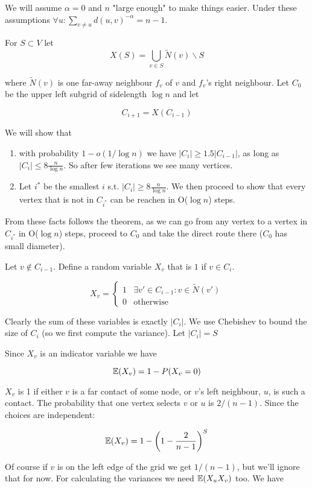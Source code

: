 \begin{pr} We will assume $\alpha=0$ and $n$ "large enough" to make things easier. Under these assumptions $\forall u: \sum_{v\neq u} d(u,v)^{-\alpha} = n-1$. 

For $S\subset V$ let 
\[X(S) = \bigcup_{v\in S} \tilde N(v) \backslash S\]

where $\tilde N(v)$ is one far-away neighbour $f_v$ of $v$ and $f_v$'s right neighbour. Let $C_0$ be the upper left subgrid of sidelength $\log n$ and let

\[C_{i+1} = X(C_{i-1})\]

We will show that 

\begin{enumerate}
\item with probability $1-o(1/\log n)$ we have $|C_i| \geq 1.5 |C_{i-1}|$, as long as $|C_i| \leq 8 \frac{n}{\log n}$. So after few iterations we see many vertices. 
\item Let $i^*$ be the smallest $i$ s.t. $|C_i| \geq 8\frac{n}{\log n}$. We then proceed to show that every vertex that is not in $C_{i^*}$ can be reachen in O($\log n$) steps.
\end{enumerate}

From these facts follows the theorem, as we can go from any vertex to a vertex in $C_{i^*}$ in O($\log n$) steps, proceed to $C_0$ and take the direct route there ($C_0$ has small diameter).

Let $v\not \in C_{i-1}$. Define a random variable $X_v$ that is $1$ if $v\in C_i$.

\[X_v = \begin{cases} 1& \exists v'\in C_{i-1}: v\in \tilde N(v')\\ 0& \text{otherwise}\end{cases}\]

Clearly the sum of these variables is exactly $|C_i|$. We use Chebishev to bound the size of $C_i$ (so we first compute the variance). Let $|C_i| = S$

Since $X_v$ is an indicator variable we have 

\[\mathbb{E}(X_v) = 1-P(X_v=0)\]
	
$X_v$ is 1 if either $v$ is a far contact of some node, or $v$'s left neighbour, $u$, is such a contact. The probability that one vertex selects $v$ or $u$ is $2/(n-1)$. Since the choices are independent:

\[\mathbb{E}(X_v) = 1-\left(1-\frac{2}{n-1}\right)^S\]

Of course if $v$ is on the left edge of the grid we get $1/(n-1)$, but we'll ignore that for now. For calculating the variances we need $\mathbb{E}(X_uX_v)$ too. We have


\end{pr}
